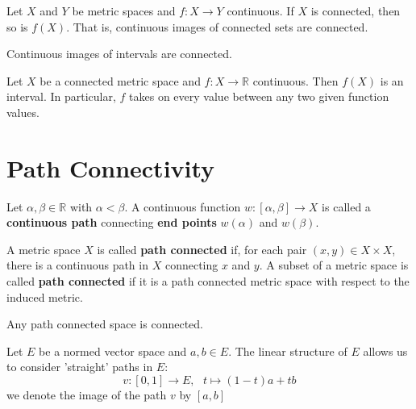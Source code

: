\begin{theorem}
    Let \(X\) and \(Y\) be metric spaces and \(f \colon X \to Y\) continuous. If \(X\)
    is connected, then so is \(f\left(X\right)\). That is, continuous images of connected
    sets are connected. 
\end{theorem}

\begin{corollary}
    Continuous images of intervals are connected. 
\end{corollary}

\begin{theorem}
    Let \(X\) be a connected metric space and \(f \colon X \to \mathbb{R}\) continuous. 
    Then \(f\left(X\right)\) is an interval. In particular, \(f\) takes on every value 
    between any two given function values. 
\end{theorem}

\section{Path Connectivity}

\begin{definition}
    Let \(\alpha, \beta \in \mathbb{R}\) with \(\alpha < \beta\). A continuous function 
    \(w \colon [\alpha, \beta ] \to X\) is called a \textbf{continuous path} connecting 
    \textbf{end points} \(w\left(\alpha\right)\) and \(w\left(\beta\right)\). 
\end{definition}


\begin{definition}
    A metric space \(X\) is called \textbf{path connected} if, for each pair \(\left(x, y\right) \in X \times X\), 
    there is a continuous path in \(X\) connecting \(x\) and \(y\). A subset of a metric space 
    is called \textbf{path connected} if it is a path connected metric space with respect 
    to the induced metric. 
\end{definition}

\begin{proposition}
    Any path connected space is connected. 
\end{proposition}

Let \(E\) be a normed vector space and \(a, b \in E\). The linear structure of \(E\) allows us 
to consider 'straight' paths in \(E\): 
\[
    v \colon [0, 1] \to E, \:\:\: t \mapsto (1-t)a + tb  
\]
we denote the image of the path \(v\) by \([a, b] \)

